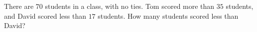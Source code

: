 There are $70$ students in a class, with no ties. Tom scored more than $35$ students, and David scored less than $17$ students. How many students scored less than David?

